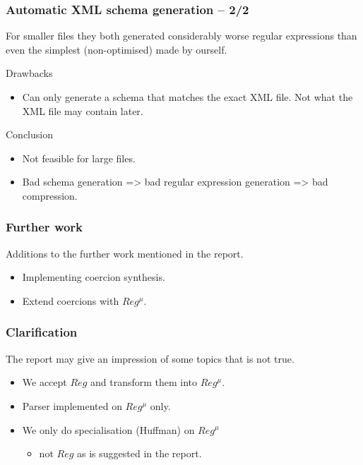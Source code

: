 \documentclass[slidestop,compress,mathserif, xcolor=table]{beamer}
\begin{document}
\begin{frame}[c]
  \frametitle{Automatic XML schema generation -- 2/2}
  
  For smaller files they both generated considerably worse regular expressions
  than even the simplest (non-optimised) made by ourself.

  Drawbacks

  \begin{itemize}
  \item Can only generate a schema that matches the exact XML file. Not what the
    XML file may contain later. 
  \end{itemize}

  Conclusion 

  \begin{itemize}
  \item Not feasible for large files.

  \item Bad schema generation => bad regular expression generation => bad compression.
  \end{itemize}

\end{frame}

\begin{frame}[c]
  \frametitle{Further work}
  
  Additions to the further work mentioned in the report.

  \begin{itemize}
  \item Implementing coercion synthesis.

  \item Extend coercions with $Reg^\mu$.

  \end{itemize}

\end{frame}


\begin{frame}[c]
  \frametitle{Clarification}
  
  The report may give an impression of some topics that is not true.

  \begin{itemize}
  \item We accept $Reg$ and transform them into $Reg^\mu$.

  \item Parser implemented on $Reg^\mu$ only.

  \item We only do specialisation (Huffman) on $Reg^\mu$ 
    \begin{itemize}
    \item not $Reg$ as is suggested in the report.
    \end{itemize}

  \end{itemize}
\end{frame}
\end{document}
